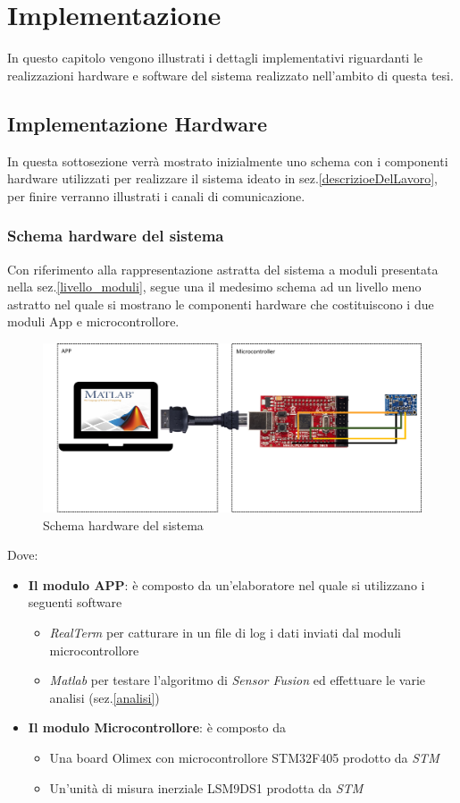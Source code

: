 \chapter{Implementazione}
\label{implementazione}
In questo capitolo vengono illustrati i dettagli implementativi riguardanti le realizzazioni hardware e software del sistema realizzato nell'ambito di questa tesi.

\section{Implementazione Hardware}
In questa sottosezione verrà mostrato inizialmente uno schema con i componenti hardware utilizzati per realizzare il sistema ideato in sez.\ref{descrizioeDelLavoro}, per finire verranno illustrati i canali di comunicazione.
\subsection{Schema hardware del sistema}
Con riferimento alla rappresentazione astratta del sistema a moduli presentata nella sez.\ref{livello_moduli}, segue una il medesimo schema ad un livello meno astratto nel quale si mostrano le componenti hardware che costituiscono i due moduli App e microcontrollore.
\begin{figure}
	\includegraphics[width=\textwidth]{implementazione/schemaHardware.png}
	\caption{Schema hardware del sistema}
	\label{fig:schemaHardware}
\end{figure}
\newpage
Dove:
\begin{itemize}
	\item \textbf{Il modulo APP}: è composto da un'elaboratore nel quale si utilizzano i seguenti software
	\begin{itemize}
	\item \textit{RealTerm} per catturare in un file di log i dati inviati dal moduli microcontrollore
	\item \textit{Matlab} per testare l'algoritmo di \textit{Sensor Fusion} ed effettuare le varie analisi (sez.\ref{analisi})
	\end{itemize}
	\item \textbf{Il modulo Microcontrollore}: è composto da
	\begin{itemize}
		\item Una board Olimex con microcontrollore STM32F405 prodotto da \textit{STM}
		\item Un'unità di misura inerziale LSM9DS1 prodotta da \textit{STM}
	\end{itemize}
\end{itemize}
